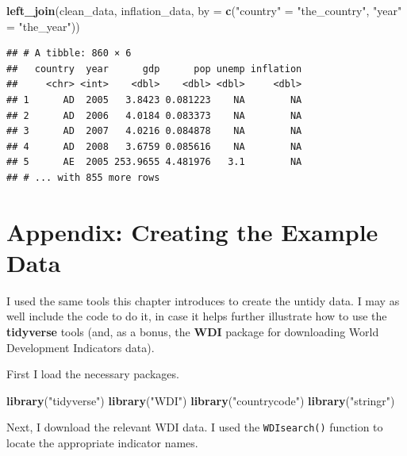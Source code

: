 \documentclass[12pt,oneside,openany]{book}
\newenvironment{Shaded}{\begin{snugshade}}{\end{snugshade}}
\newcommand{\KeywordTok}[1]{\textcolor[rgb]{0.13,0.29,0.53}{\textbf{{#1}}}}
\newcommand{\DataTypeTok}[1]{\textcolor[rgb]{0.13,0.29,0.53}{{#1}}}
\newcommand{\StringTok}[1]{\textcolor[rgb]{0.31,0.60,0.02}{{#1}}}
\newcommand{\NormalTok}[1]{{#1}}
\begin{document}
\begin{Shaded}
\begin{Highlighting}[]
\KeywordTok{left_join}\NormalTok{(clean_data,}
          \NormalTok{inflation_data,}
          \DataTypeTok{by =} \KeywordTok{c}\NormalTok{(}\StringTok{"country"} \NormalTok{=}\StringTok{ "the_country"}\NormalTok{, }\StringTok{"year"} \NormalTok{=}\StringTok{ "the_year"}\NormalTok{))}
\end{Highlighting}
\end{Shaded}

\begin{verbatim}
## # A tibble: 860 × 6
##   country  year      gdp      pop unemp inflation
##     <chr> <int>    <dbl>    <dbl> <dbl>     <dbl>
## 1      AD  2005   3.8423 0.081223    NA        NA
## 2      AD  2006   4.0184 0.083373    NA        NA
## 3      AD  2007   4.0216 0.084878    NA        NA
## 4      AD  2008   3.6759 0.085616    NA        NA
## 5      AE  2005 253.9655 4.481976   3.1        NA
## # ... with 855 more rows
\end{verbatim}

\section{Appendix: Creating the Example
Data}\label{appendix-creating-the-example-data}

I used the same tools this chapter introduces to create the untidy data.
I may as well include the code to do it, in case it helps further
illustrate how to use the \textbf{tidyverse} tools (and, as a bonus, the
\textbf{WDI} package for downloading World Development Indicators data).

First I load the necessary packages.

\begin{Shaded}
\begin{Highlighting}[]
\KeywordTok{library}\NormalTok{(}\StringTok{"tidyverse"}\NormalTok{)}
\KeywordTok{library}\NormalTok{(}\StringTok{"WDI"}\NormalTok{)}
\KeywordTok{library}\NormalTok{(}\StringTok{"countrycode"}\NormalTok{)}
\KeywordTok{library}\NormalTok{(}\StringTok{"stringr"}\NormalTok{)}
\end{Highlighting}
\end{Shaded}

Next, I download the relevant WDI data. I used the \texttt{WDIsearch()}
function to locate the appropriate indicator names.
\end{document}
